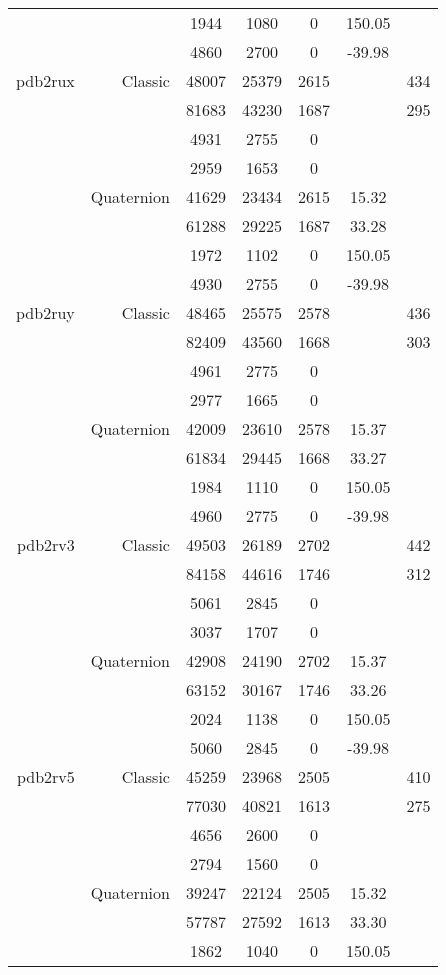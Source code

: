 \begin{xltabular}{\textwidth}{r|rcccSc}
& & 1944 & 1080 & 0 & 150.05 & \\
& & 4860 & 2700 & 0 & -39.98 & \\ \addlinespace
pdb2rux & Classic & 48007 & 25379 & 2615 & & 434 \\
& & 81683 & 43230 & 1687 & & 295 \\
& & 4931 & 2755 & 0 & & \\
& & 2959 & 1653 & 0 & & \\
& Quaternion & 41629 & 23434 & 2615 & 15.32 & \\
& & 61288 & 29225 & 1687 & 33.28 & \\
& & 1972 & 1102 & 0 & 150.05 & \\
& & 4930 & 2755 & 0 & -39.98 & \\ \addlinespace
pdb2ruy & Classic & 48465 & 25575 & 2578 & & 436 \\
& & 82409 & 43560 & 1668 & & 303 \\
& & 4961 & 2775 & 0 & & \\
& & 2977 & 1665 & 0 & & \\
& Quaternion & 42009 & 23610 & 2578 & 15.37 & \\
& & 61834 & 29445 & 1668 & 33.27 & \\
& & 1984 & 1110 & 0 & 150.05 & \\
& & 4960 & 2775 & 0 & -39.98 & \\ \addlinespace
pdb2rv3 & Classic & 49503 & 26189 & 2702 & & 442 \\
& & 84158 & 44616 & 1746 & & 312 \\
& & 5061 & 2845 & 0 & & \\
& & 3037 & 1707 & 0 & & \\
& Quaternion & 42908 & 24190 & 2702 & 15.37 & \\
& & 63152 & 30167 & 1746 & 33.26 & \\
& & 2024 & 1138 & 0 & 150.05 & \\
& & 5060 & 2845 & 0 & -39.98 & \\ \addlinespace
pdb2rv5 & Classic & 45259 & 23968 & 2505 & & 410 \\
& & 77030 & 40821 & 1613 & & 275 \\
& & 4656 & 2600 & 0 & & \\
& & 2794 & 1560 & 0 & & \\
& Quaternion & 39247 & 22124 & 2505 & 15.32 & \\
& & 57787 & 27592 & 1613 & 33.30 & \\
& & 1862 & 1040 & 0 & 150.05 & \\

\end{xltabular}
